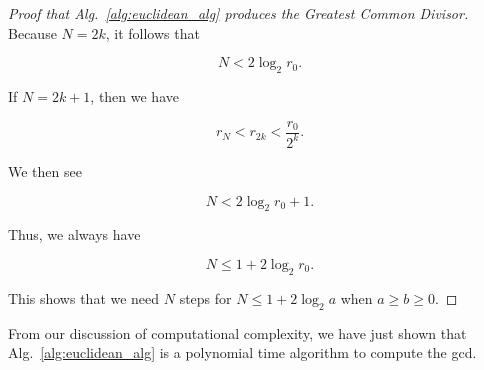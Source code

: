 \begin{proof}[Proof that Alg.~\ref{alg:euclidean_alg} produces the
    Greatest Common Divisor]
\noindent
Because $N = 2k$, it follows that

\begin{equation}
    N < 2\log_{2}r_{0}.
\end{equation}

\noindent
If $N = 2k+1$, then we have

\begin{equation}
    r_{N} < r_{2k} < \frac{r_{0}}{2^{k}}.
\end{equation}

\noindent
We then see

\begin{equation}
    N < 2\log_{2}r_{0} + 1.
\end{equation}

\noindent
Thus, we always have

\begin{equation}
    N \le 1 + 2\log_{2}r_{0}.
\end{equation}

\noindent
This shows that we need $N$ steps for $N \le 1 + 2\log_{2}a$
when $a\ge b\ge 0$.
\end{proof}

From our discussion of computational complexity,
we have just shown that Alg.~\ref{alg:euclidean_alg}
is a polynomial time algorithm to compute the gcd.

